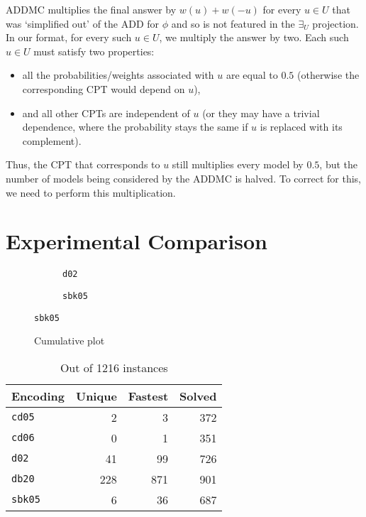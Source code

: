 \documentclass{article}
\theoremstyle{definition}
\theoremstyle{remark}
\begin{document}
ADDMC multiplies the final answer by $w(u)+w(-u)$ for every $u \in U$ that was
`simplified out' of the ADD for $\phi$ and so is not featured in the $\exists_U$
projection. In our format, for every such $u \in U$, we multiply the answer by
two. Each such $u \in U$ must satisfy two properties:
\begin{itemize}
\item all the probabilities/weights associated with $u$ are equal to $0.5$
  (otherwise the corresponding CPT would depend on $u$),
\item and all other CPTs are independent of $u$ (or they may have a trivial
  dependence, where the probability stays the same if $u$ is replaced with its
  complement).
\end{itemize}
Thus, the CPT that corresponds to $u$ still multiplies every model by $0.5$, but
the number of models being considered by the ADDMC is halved. To correct for
this, we need to perform this multiplication.

\section{Experimental Comparison} \label{sec:experiments}

\begin{figure}
  \begin{subfigure}{0.5\textwidth}
    \centering
    
    \caption{\texttt{d02}}
  \end{subfigure}
  \begin{subfigure}{0.5\textwidth}
    \centering
    
    \caption{\texttt{sbk05}}
  \end{subfigure}
\end{figure}

\begin{figure}
  \centering
  
  \caption{Cumulative plot}
\end{figure}

\begin{table}
  \caption{Out of 1216 instances}
  \centering
  \begin{tabular}{lrrr}
    \toprule
    Encoding & Unique & Fastest & Solved \\
    \midrule
    \texttt{cd05} & 2 & 3 & 372 \\
    \texttt{cd06} & 0 & 1 & 351 \\
    \texttt{d02} & 41 & 99 & 726 \\
    \texttt{db20} & 228 & 871 & 901 \\
    \texttt{sbk05} & 6 & 36 & 687 \\
    \bottomrule
  \end{tabular}
\end{table}
\end{document}
